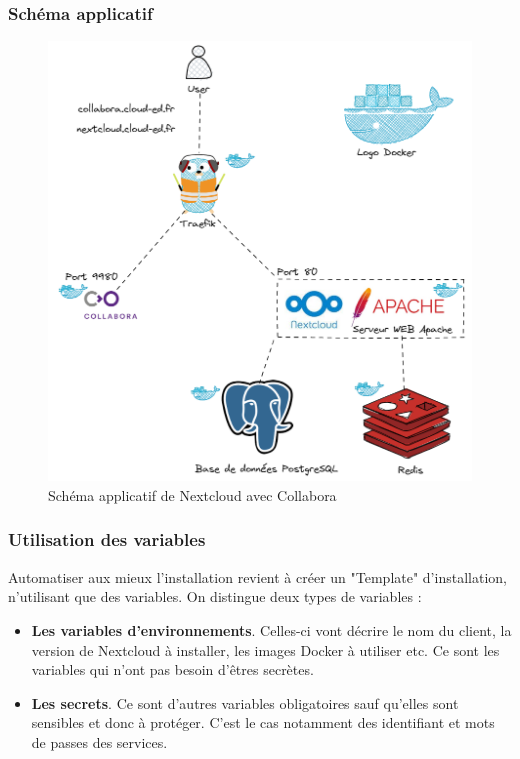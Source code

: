\documentclass[12pt]{article}
\begin{document}
\newpage
\subsubsection{Schéma applicatif}
\begin{figure}[!ht]
    \centering
    \includegraphics[width=\textwidth]{src/graph_nextcloud.png}
    \caption{Schéma applicatif de \gls{Nextcloud} avec \gls{Collabora}}
    \label{fig:nextcloudXcollabora}
\end{figure}

\newpage
\subsubsection{Utilisation des variables}
Automatiser aux mieux l'installation revient à créer un "Template" d'installation, n'utilisant que des variables. 
On distingue deux types de variables :
\begin{itemize}
    \item \textbf{Les variables d'environnements}. Celles-ci vont décrire le nom du client, la version de \gls{Nextcloud} à installer, les images Docker à utiliser etc. 
    Ce sont les variables qui n'ont pas besoin d'êtres secrètes.
    \item \textbf{Les secrets}. Ce sont d'autres variables obligatoires sauf qu'elles sont sensibles et donc à protéger. 
    C'est le cas notamment des identifiant et mots de passes des services.
\end{itemize}
\end{document}
